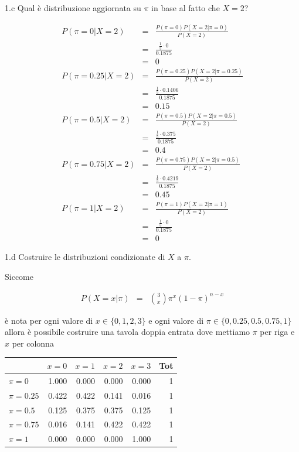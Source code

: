 \documentclass[
  11pt,
]{book}
\theoremstyle{mytheoremstyle}
\theoremstyle{mydefstyle}
\newenvironment{sol}
  {
  \begin{tcolorbox}[enhanced,breakable,arc=0.1mm,boxrule=1pt,colback=white,colframe=iblue,
  title=\bf \fontfamily{lmss}\selectfont \hspace{.5 cm} Soluzione,drop fuzzy shadow]

}{
\end{tcolorbox}
  }
\begin{document}
1.c Qual è distribuzione aggiornata su \(\pi\) in base al fatto che \(X=2\)?

\begin{sol}
\begin{eqnarray*}
P(\pi=0|X=2)   &=&  \frac{P(\pi=0)P(X=2|\pi=0)}{P(X=2)}\\
                 &=&  \frac{\frac 15 \cdot 0}{0.1875}\\
                 &=& 0\\
P(\pi=0.25|X=2)   &=&  \frac{P(\pi=0.25)P(X=2|\pi=0.25)}{P(X=2)}\\
                 &=&  \frac{\frac 15 \cdot 0.1406}{0.1875}\\
                 &=& 0.15\\
P(\pi=0.5|X=2)   &=&  \frac{P(\pi=0.5)P(X=2|\pi=0.5)}{P(X=2)}\\
                 &=&  \frac{\frac 15 \cdot 0.375}{0.1875}\\
                 &=& 0.4\\
P(\pi=0.75|X=2)   &=&  \frac{P(\pi=0.75)P(X=2|\pi=0.5)}{P(X=2)}\\
                 &=&  \frac{\frac 15 \cdot 0.4219}{0.1875}\\
                 &=& 0.45\\
P(\pi=1|X=2)   &=&  \frac{P(\pi=1)P(X=2|\pi=1)}{P(X=2)}\\
                 &=&  \frac{\frac 15 \cdot 0}{0.1875}\\
                 &=& 0
\end{eqnarray*}

\end{sol}

1.d Costruire le distribuzioni condizionate di \(X\) a \(\pi\).

\begin{sol}

Siccome

\begin{eqnarray*}
  P(X=x|\pi) &=&  \binom{3}{x}\pi^x(1-\pi)^{n-x}
\end{eqnarray*}

è nota per ogni valore di \(x\in\{0,1,2,3\}\) e ogni valore di \(\pi\in\{0,0.25,0.5,0.75,1\}\) allora è possibile costruire una
tavola doppia entrata dove mettiamo \(\pi\) per riga e \(x\) per colonna

\begin{tabular}{lrrrrr}
\toprule
  & $x=0$ & $x=1$ & $x=2$ & $x=3$ & Tot\\
\midrule
$\pi=0$ & 1.000 & 0.000 & 0.000 & 0.000 & 1\\
$\pi=0.25$ & 0.422 & 0.422 & 0.141 & 0.016 & 1\\
$\pi=0.5$ & 0.125 & 0.375 & 0.375 & 0.125 & 1\\
$\pi=0.75$ & 0.016 & 0.141 & 0.422 & 0.422 & 1\\
$\pi=1$ & 0.000 & 0.000 & 0.000 & 1.000 & 1\\
\bottomrule
\end{tabular}

\end{sol}
\end{document}
